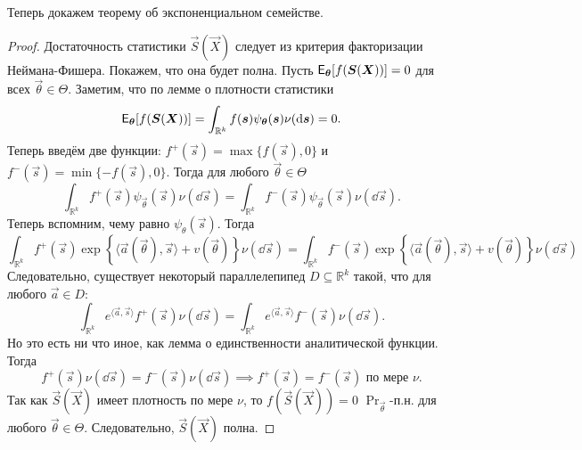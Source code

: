 Теперь докажем теорему об экспоненциальном семействе.
\begin{proof}
	Достаточность статистики $\vec{S}(\vec{X})$ следует из критерия факторизации Неймана-Фишера. Покажем, что она будет полна. Пусть $\operatorname{\mathsf{E}}_{\bm{\theta}}[f(\bm{S}(\bm{X}))] = 0$ для всех $\vec{\theta} \in \Theta$. Заметим, что по лемме о плотности статистики
	\[
		\operatorname{\mathsf{E}}_{\bm{\theta}}[f(\bm{S}(\bm{X}))]
		= \int_{\mathbb{R}^{k}} f(\bm{s})\psi_{\bm{\theta}}(\bm{s})\nu(\dd \bm{s})
		= 0.
	\]
	Теперь введём две функции: $f^{+}(\vec{s}) = \max\{f(\vec{s}), 0\}$ и $f^{-}(\vec{s}) = \min\{-f(\vec{s}), 0\}$. Тогда для любого $\vec{\theta} \in \Theta$
	\[
		\int_{\mathbb{R}^{k}} f^{+}(\vec{s})\psi_{\vec{\theta}}(\vec{s})\nu(\dd \vec{s})
		= \int_{\mathbb{R}^{k}} f^{-}(\vec{s})\psi_{\vec{\theta}}(\vec{s})\nu(\dd \vec{s}).
	\]
	Теперь вспомним, чему равно $\psi_{\theta}(\vec{s})$. Тогда
	\[
		\int_{\mathbb{R}^{k}} f^{+}(\vec{s})\exp\left\{\langle \vec{a}(\vec{\theta}), \vec{s}\rangle + v(\vec{\theta})\right\}\nu(\dd \vec{s})
		= \int_{\mathbb{R}^{k}} f^{-}(\vec{s})\exp\left\{\langle \vec{a}(\vec{\theta}), \vec{s}\rangle + v(\vec{\theta})\right\}\nu(\dd \vec{s})
	\]
	Следовательно, существует некоторый параллелепипед $D \subseteq \mathbb{R}^{k}$ такой, что для любого $\vec{a} \in D$:
	\[
		\int_{\mathbb{R}^{k}} e^{\langle \vec{a}, \vec{s}\rangle} f^{+}(\vec{s}) \nu(\dd \vec{s})
		= \int_{\mathbb{R}^{k}} e^{\langle \vec{a}, \vec{s}\rangle} f^{-}(\vec{s}) \nu(\dd \vec{s}).
	\]
	Но это есть ни что иное, как лемма о единственности аналитической функции. Тогда 
	\[
		f^{+}(\vec{s}) \nu(\dd \vec{s})
		= f^{-}(\vec{s}) \nu(\dd \vec{s})
		\implies
		f^{+}(\vec{s}) 
		= f^{-}(\vec{s}) \text{ по мере } \nu.
	\]
	Так как $\vec{S}(\vec{X})$ имеет плотность по мере $\nu$, то $f(\vec{S}(\vec{X})) = 0$ $\Pr_{\vec{\theta}}$-п.н. для любого $\vec{\theta} \in \Theta$. Следовательно, $\vec{S}(\vec{X})$ полна.
\end{proof}

